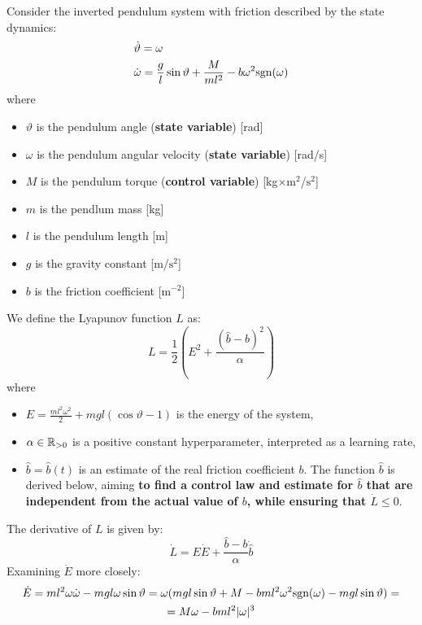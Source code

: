 \documentclass[12pt]{article}
\begin{document}
Consider the inverted pendulum system with friction described by the state dynamics:
\begin{equation}
    \label{eqn_state_dynamics_inv_pendulum}
    \begin{aligned}
        &\dot{\vartheta} =  \omega \\
        &\dot{\omega} = \frac{g}{l}\sin \vartheta + \frac{M}{ m l ^ 2} - b \omega ^ 2 {\text{sgn}} (\omega)
    \end{aligned}
\end{equation}
where
\begin{itemize}
    \item $\vartheta$ is the pendulum angle (\textbf{state variable}) [rad]
    \item $\omega$ is the pendulum angular velocity (\textbf{state variable}) [rad/s]
    \item $M$ is the pendulum torque (\textbf{control variable}) [kg$\times\text{m} ^ 2$/$\text{s} ^ 2$]  
    \item $m$ is the pendlum mass [kg]
    \item $l$ is the pendulum length [m]
    \item $g$ is the gravity constant [m/$\text{s}^2$]
    \item $b$ is the friction coefficient [$\text{m} ^ {-2}$] 
\end{itemize}
We define the Lyapunov function $L$ as:
$$
    L = \frac{1}{2} \left(E^2 + \frac{(\hat{b} - b) ^ 2}{\alpha}\right) 
$$
where
\begin{itemize}
    \item $E = \frac{m l ^2 \omega ^ 2}{2} + mgl(\cos\vartheta - 1)$ is the energy of the system,
    \item $\alpha \in {\mathbb{R}}_{>0}$ is a positive constant hyperparameter, interpreted as a learning rate,
    \item $\hat{b} = \hat{b}(t)$ is an estimate of the real friction coefficient $b$. The function $\hat{b}$ is derived below, aiming \textbf{to find a control law and estimate for $\hat{b}$ that are independent from the actual value of $b$, while ensuring that $\dot{L} \leq 0$}. 
\end{itemize}
The derivative of $L$ is given by:
$$
    \dot{L} = E \dot{E} + \frac{\hat{b} - b}{\alpha} \dot{\hat{b}}
$$
Examining $\dot{E}$ more closely:
\begin{multline*}
    \dot{E} = ml^2 \omega \dot{\omega} - mgl \omega \sin\vartheta  = \omega (mgl \sin \vartheta + M - b ml^2 \omega ^ 2 {\text{sgn}}(\omega)  - mgl \sin \vartheta) = 
    \\
    = M\omega - b ml^2 |\omega| ^ 3
\end{multline*}
\end{document}
